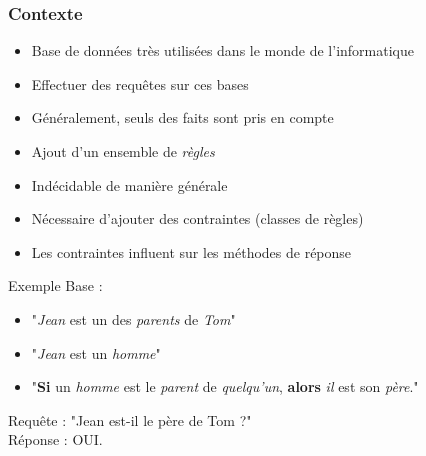 \begin{frame}
	\frametitle{Contexte}
	\begin{itemize}
		\item Base de données très utilisées dans le monde de l'informatique
		\item Effectuer des requêtes sur ces bases
		\item Généralement, seuls des faits sont pris en compte
		\item Ajout d'un ensemble de {\em règles}
		\item Indécidable de manière générale
		\item Nécessaire d'ajouter des contraintes (classes de règles) 
		\item Les contraintes influent sur les méthodes de réponse
	\end{itemize}
	\begin{exampleblock}{Exemple}
		Base :
		\begin{itemize}
			\item "{\em Jean} est un des {\em parents} de {\em Tom}"
			\item "{\em Jean} est un {\em homme}"
			\item "{\bf Si} un {\em homme} est le {\em parent} de {\em quelqu'un}, {\bf
			alors} {\em il} est son {\em père}." 
		\end{itemize}
		Requête : "Jean est-il le père de Tom ?"\\
		Réponse : OUI.
	\end{exampleblock}
\end{frame}


